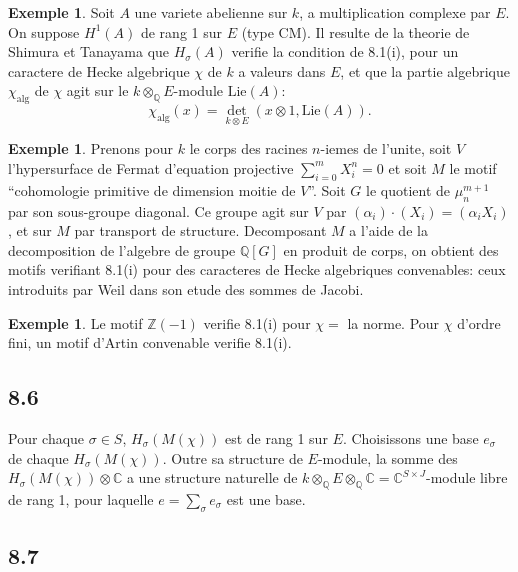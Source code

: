 \documentclass[12pt,a4paper]{article}
\theoremstyle{plain}
\theoremstyle{definition}
\newtheorem{example}[definition]{Exemple}
\theoremstyle{remark}
\newcommand{\Q}{\mathbb{Q}}
\newcommand{\C}{\mathbb{C}}
\newcommand{\Z}{\mathbb{Z}}
\begin{document}
\begin{example}
Soit $A$ une variete abelienne sur $k$, a multiplication complexe par $E$. On suppose
$H^1(A)$ de rang 1 sur $E$ (type CM). Il resulte de la theorie de Shimura et
Tanayama que $H_\sigma(A)$ verifie la condition de 8.1(i), pour un caractere de Hecke
algebrique $\chi$ de $k$ a valeurs dans $E$, et que la partie algebrique $\chi_{\text{alg}}$ de $\chi$
agit sur le $k \otimes_\Q E$-module $\text{Lie}(A)$:
\[
\chi_{\text{alg}}(x) = \det_{k \otimes E}(x \otimes 1, \text{Lie}(A)).
\]
\end{example}

\begin{example}
Prenons pour $k$ le corps des racines $n$-iemes de l'unite, soit $V$ l'hypersurface
de Fermat d'equation projective $\sum_{i=0}^{m} X_i^n = 0$ et soit $M$ le motif ``cohomologie
primitive de dimension moitie de $V$''. Soit $G$ le quotient de $\mu_n^{m+1}$ par son
sous-groupe diagonal. Ce groupe agit sur $V$ par $(\alpha_i) \cdot (X_i) = (\alpha_i X_i)$, et
sur $M$ par transport de structure. Decomposant $M$ a l'aide de la decomposition de
l'algebre de groupe $\Q[G]$ en produit de corps, on obtient des motifs verifiant 8.1(i)
pour des caracteres de Hecke algebriques convenables: ceux introduits par Weil dans
son etude des sommes de Jacobi.
\end{example}

\begin{example}
Le motif $\Z(-1)$ verifie 8.1(i) pour $\chi =$ la norme. Pour $\chi$ d'ordre fini, un motif
d'Artin convenable verifie 8.1(i).
\end{example}

\subsection*{8.6}

Pour chaque $\sigma \in S$, $H_\sigma(M(\chi))$ est de rang 1 sur $E$. Choisissons une base $e_\sigma$
de chaque $H_\sigma(M(\chi))$. Outre sa structure de $E$-module, la somme des
$H_\sigma(M(\chi)) \otimes \C$ a une structure naturelle de $k \otimes_\Q E \otimes_\Q \C = \C^{S \times J}$-module
libre de rang 1, pour laquelle $e = \sum_\sigma e_\sigma$ est une base.

\subsection*{8.7}
\end{document}
